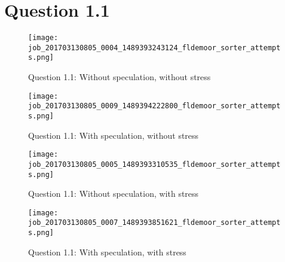 \section{Question 1.1}

\begin{figure}[!ht]
    \centering
    \texttt{[image: job\_201703130805\_0004\_1489393243124\_fldemoor\_sorter\_attempts.png]}
    \caption{Question 1.1: Without speculation, without stress}
    \label{1.1.specOff.noStress}
\end{figure}
\newpage

\begin{figure}[!ht]
    \centering
    \texttt{[image: job\_201703130805\_0009\_1489394222800\_fldemoor\_sorter\_attempts.png]}
    \caption{Question 1.1: With speculation, without stress}
    \label{1.1.specOn.noStress}
\end{figure}

\begin{figure}[!ht]
    \centering
    \texttt{[image: job\_201703130805\_0005\_1489393310535\_fldemoor\_sorter\_attempts.png]}
    \caption{Question 1.1: Without speculation, with stress}
    \label{1.1.specOff.Stress}
\end{figure}
\newpage

\begin{figure}[!ht]
    \centering
    \texttt{[image: job\_201703130805\_0007\_1489393851621\_fldemoor\_sorter\_attempts.png]}
    \caption{Question 1.1: With speculation, with stress}
    \label{1.1.specOn.Stress}
\end{figure}
\newpage

\newpage
